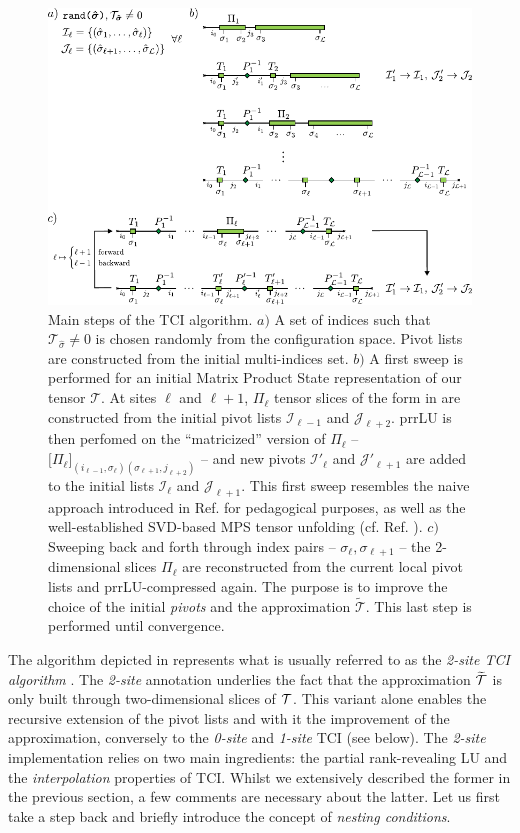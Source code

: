 \begin{figure}[ht!]
	\centering
	\includegraphics[width=\textwidth]{figures/TCI.pdf}
	\caption{Main steps of the TCI algorithm. $a)$ A set of indices such that $\mathcal{T}_{\hat \sigma} \neq 0$ is chosen randomly from the configuration space. Pivot lists are constructed from the initial multi-indices set. $b)$ A first sweep is performed for an initial Matrix Product State representation of our tensor $\mathcal{T}$. At sites $\ell$ and $\ell+1$, $\Pi_\ell$ tensor slices of the form in  are constructed from the initial pivot lists $\mathcal{I}_{\ell-1}$ and $\mathcal{J}_{\ell+2}$. prrLU is then perfomed on the ``matricized'' version of $\Pi_\ell$ -- $\bigl[\Pi_\ell\bigr]_{(i_{\ell -1}, \sigma_\ell) (\sigma_{\ell+1}, j_{\ell +2})}$ -- and new pivots $\mathcal{I}'_\ell$ and $\mathcal{J}'_{\ell+1}$ are added to the initial lists $\mathcal{I}_\ell$ and $\mathcal{J}_{\ell+1}$. This first sweep resembles the naive approach introduced in Ref. \cite{Fernandez2022} for pedagogical purposes, as well as the well-established SVD-based MPS tensor unfolding (cf. Ref. \cite{vonDelftTNNotes}). $c)$ Sweeping back and forth through index pairs -- $\sigma_\ell, \sigma_{\ell +1}$ -- the 2-dimensional slices $\Pi_\ell$ are reconstructed from the current local pivot lists and prrLU-compressed again. The purpose is to improve the choice of the initial \textit{pivots} and the approximation $\widetilde{\mathcal{T}}$. This last step is performed until convergence.}
	\label{fig:TCIalg}
\end{figure}

The algorithm depicted in  represents what is usually referred to as the \textit{2-site TCI algorithm} \cite{Fernandez2024}. The \textit{2-site} annotation underlies the fact that the approximation $\widetilde{\mathcal{T}}$ is only built through two-dimensional slices of $\mathcal{T}$. This variant alone enables the recursive extension of the pivot lists and with it the improvement of the approximation, conversely to the \textit{0-site} and \textit{1-site} TCI (see below). The \textit{2-site} implementation relies on two main ingredients: the partial rank-revealing LU and the \textit{interpolation} properties of TCI. Whilst we extensively described the former in the previous section, a few comments are necessary about the latter. Let us first take a step back and briefly introduce the concept of \textit{nesting conditions}. 

